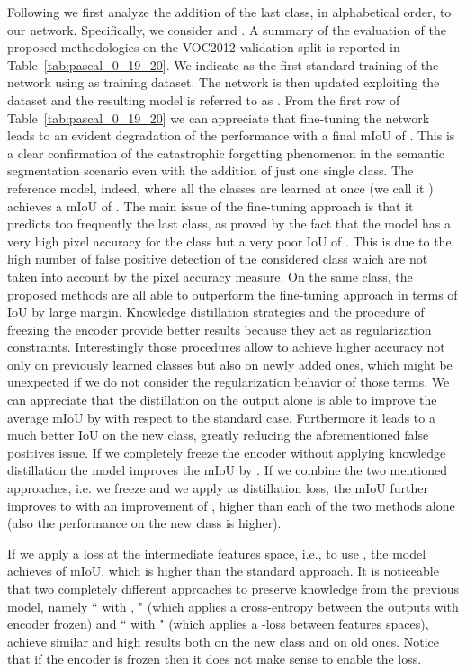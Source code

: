 \documentclass[10pt,twocolumn,letterpaper]{article}
\begin{document}
Following \cite{shmelkov2017incremental} we first analyze the addition of the last class, in alphabetical order, to our network. Specifically, we consider  and . A summary of the evaluation of the proposed methodologies  on the VOC2012 validation split is reported in Table~\ref{tab:pascal_0_19_20}. We indicate as  the first standard training of the network using  as training dataset. The network is then updated exploiting the dataset  and the resulting model is referred to as .
From the first row of Table~\ref{tab:pascal_0_19_20} we can appreciate that fine-tuning the network leads to an evident degradation of the performance with a final mIoU of . This is a clear confirmation of the catastrophic forgetting phenomenon in the semantic segmentation scenario even with the addition of just one single class. 
The reference model, indeed, where all the  classes are learned at once (we call it ) achieves a mIoU of . The main issue of the fine-tuning approach is that it predicts too frequently the last  class, as proved by the fact that the model has a very high pixel accuracy for the  class but a very poor IoU of . This is due to the high number of false positive detection of the considered class which are not taken into account by the pixel accuracy measure. On the same class, the proposed methods are all able to outperform the fine-tuning approach in terms of IoU by large margin.
Knowledge distillation strategies and the procedure of freezing the encoder provide better results because they act as regularization constraints. Interestingly those procedures allow to achieve higher accuracy not only on previously learned classes but also on newly added ones, which might be unexpected if we do not consider the regularization behavior of those terms. 
We can appreciate that the distillation on the output  alone is able to improve the average mIoU by  with respect to the standard case. Furthermore it leads to a much better IoU on the new class, greatly reducing the aforementioned false positives issue. If we completely freeze the encoder  without applying knowledge distillation the model improves the mIoU by . 
If we combine the two mentioned approaches, i.e. we freeze  and we apply  as distillation loss, the mIoU further improves to   with an  improvement of , higher than each of the two methods alone (also the performance on the new class is higher).

If we apply a  loss at the intermediate features space, i.e., to use , the model achieves  of mIoU, which is  higher than the standard approach.
It is noticeable that two completely different approaches  to preserve knowledge from the previous model, namely `` with , " (which applies a cross-entropy between the outputs with encoder frozen) and `` with " (which applies a -loss between features spaces), achieve similar and high results both on the new class and on old ones. Notice that if the encoder is frozen then it does not make sense to enable the  loss.
\end{document}
